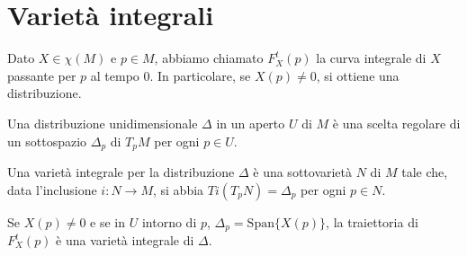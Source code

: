 \section{Varietà integrali}

Dato $X\in\chi(M)$ e $p\in M$, abbiamo chiamato $F_X^t(p)$ la curva integrale di $X$ passante per $p$ al tempo $0$. In particolare, se $X(p)\neq 0$, si ottiene una distribuzione.

\begin{definition}
 Una distribuzione unidimensionale $\Delta$ in un aperto $U$ di $M$ è una scelta regolare di un sottospazio $\Delta_p$ di $T_pM$ per ogni $p\in U$.
\end{definition}

\begin{definition}
 Una varietà integrale per la distribuzione $\Delta$ è una sottovarietà $N$ di $M$ tale che, data l'inclusione $i:N\to M$, si abbia $Ti(T_pN)=\Delta_p$ per ogni $p\in N$.
\end{definition}

Se $X(p)\neq 0$ e se in $U$ intorno di $p$, $\Delta_p=\text{Span}\{X(p)\}$, la traiettoria di $F_X^t(p)$ è una varietà integrale di $\Delta$. 






























